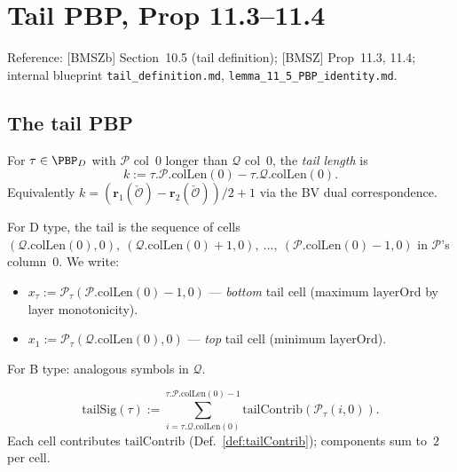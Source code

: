 \chapter{Tail PBP, Prop 11.3--11.4}
\label{chap:tail}

Reference: [BMSZb] Section~10.5 (tail definition); [BMSZ] Prop~11.3, 11.4;
internal blueprint \texttt{tail\_definition.md}, \texttt{lemma\_11\_5\_PBP\_identity.md}.

\section{The tail PBP}

\begin{definition}
  \label{def:tailLen}
  \leanok
  For $\tau \in \PBP_D$ with $\mathcal{P}$ col~0 longer than $\mathcal{Q}$ col~0, the
  \emph{tail length} is
  \[ k := \tau.\mathcal{P}.\mathrm{colLen}(0) - \tau.\mathcal{Q}.\mathrm{colLen}(0). \]
  Equivalently $k = (\mathbf{r}_1(\check{\mathcal{O}}) - \mathbf{r}_2(\check{\mathcal{O}}))/2 + 1$ via the BV dual correspondence.
\end{definition}

\begin{definition}
  \label{def:tailSymbol}
  \leanok
  For D type, the tail is the sequence of cells
  $(\mathcal{Q}.\mathrm{colLen}(0), 0),\ (\mathcal{Q}.\mathrm{colLen}(0) + 1, 0),\ \ldots,\ (\mathcal{P}.\mathrm{colLen}(0) - 1, 0)$
  in $\mathcal{P}$'s column~0. We write:
  \begin{itemize}
    \item $x_\tau := \mathcal{P}_\tau(\mathcal{P}.\mathrm{colLen}(0) - 1, 0)$ — \emph{bottom} tail cell (maximum $\mathrm{layerOrd}$ by layer monotonicity).
    \item $x_1 := \mathcal{P}_\tau(\mathcal{Q}.\mathrm{colLen}(0), 0)$ — \emph{top} tail cell (minimum $\mathrm{layerOrd}$).
  \end{itemize}
  For B type: analogous symbols in $\mathcal{Q}$.
\end{definition}

\begin{definition}[Tail signature $\mathrm{tailSig}(\tau) = (p_{\tau_t}, q_{\tau_t})$]
  \label{def:tailSignature}
  \leanok
  \[ \mathrm{tailSig}(\tau) := \sum_{i = \tau.\mathcal{Q}.\mathrm{colLen}(0)}^{\tau.\mathcal{P}.\mathrm{colLen}(0) - 1} \mathrm{tailContrib}(\mathcal{P}_\tau(i, 0)). \]
  Each cell contributes $\mathrm{tailContrib}$ (Def.~\ref{def:tailContrib}); components sum to~$2$ per cell.
\end{definition}


